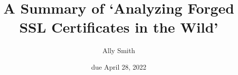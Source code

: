 \documentclass[12pt]{article}
\title{\bf A Summary of `Analyzing Forged SSL Certificates in the Wild'}
\author{Ally Smith}
\date{due April 28, 2022}
\begin{document}
\maketitle{}
\end{document}
